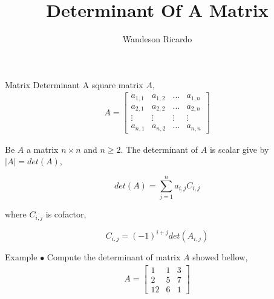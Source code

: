 \documentclass[12pt]{beamer}
\title{Determinant Of A Matrix}
\author{Wandeson Ricardo}
\begin{document}
	\maketitle
	
	\begin{frame}{Matrix Determinant}
		A square matrix $A$,
		\begin{align}
			A = \begin{bmatrix}
				a_{1,1} & a_{1,2} & ... & a_{1,n} \\
				a_{2,1} & a_{2,2} & ... & a_{2,n} \\
				\vdots & \vdots & \vdots & \vdots \\
				a_{n,1} & a_{n,2} & \ldots & a_{n,n} 
			\end{bmatrix}
		\end{align}
		
		\begin{definition}
			Be $A$ a matrix $n \times n$ and $ n \geqslant 2 $. The determinant of $A$ is scalar give by $|A| = det(A)$, 
			
			$$ det(A) = \sum_{j=1}^{n} a_{i,j} C_{i,j}$$
			
			where $C_{i,j}$ is cofactor,
			
			$$ C_{i,j} = (-1)^{i+j} det( A_{i,j} )$$			
		\end{definition}
	\end{frame}
	
	\begin{frame}{Example}
		$\bullet$ Compute the determinant of matrix $A$ showed bellow,
		\begin{align*}
			A =
			\begin{bmatrix}
				1 & 1 & 3 \\
				2 & 5 & 7 \\
				12 & 6 & 1
			\end{bmatrix}
		\end{align*}
	\end{frame}
\end{document}
